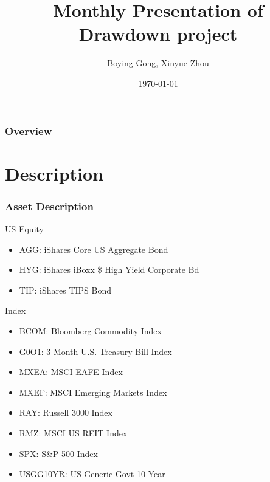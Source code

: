 \documentclass{beamer}
\title[Drawdown project]{Monthly Presentation of Drawdown project} %
\author{Boying Gong, Xinyue Zhou} %
\institute[UC Berkeley] %
{
University of California, Berkeley \\ %
\medskip
\textit{jorothy\_gong@berkeley.edu \\}
\textit{xinyue233@berkeley.edu} %
}
\date{\today} %
\newcommand\Fontviii{\fontsize{8}{9.2}\selectfont}
\begin{document}
\begin{frame}
\titlepage %
\end{frame}

\begin{frame}
\frametitle{Overview} %
\tableofcontents %
\end{frame}


\section{Description}

\begin{frame}
\frametitle{Asset Description}
\Fontviii
\begin{block}{US Equity}
\begin{itemize}
\item AGG: iShares Core US Aggregate Bond
\item HYG: iShares iBoxx \$ High Yield Corporate Bd
\item TIP: iShares TIPS Bond
\end{itemize}
\end{block}
\begin{block}{Index}
\begin{itemize}
\item BCOM: Bloomberg Commodity Index
\item G0O1: 3-Month U.S. Treasury Bill Index
\item MXEA: MSCI EAFE Index
\item MXEF: MSCI Emerging Markets Index
\item RAY: Russell 3000 Index
\item RMZ: MSCI US REIT Index
\item SPX: S\&P 500 Index
\item USGG10YR: US Generic Govt 10 Year
\end{itemize}
\end{block}
\end{frame}
\end{document}
